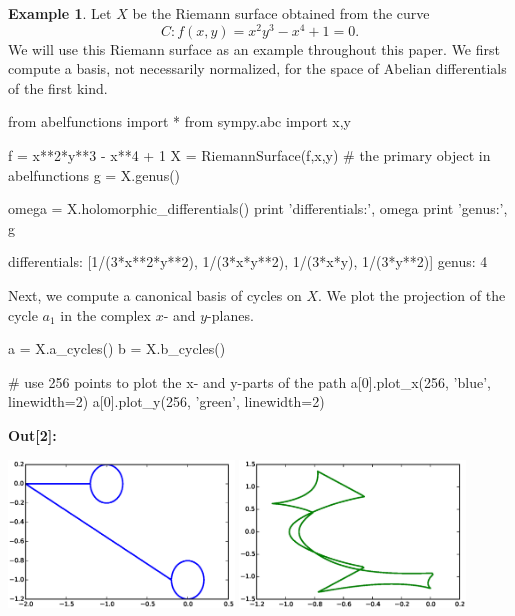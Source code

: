 \documentclass[12pt]{article}
\theoremstyle{definition}
\newtheorem{example}[theorem]{Example}
\begin{document}
\begin{example} \label{ex:riemannsurface} %
Let $X$ be the Riemann surface obtained from the curve
\begin{equation}
  C: f(x,y) = x^2y^3 - x^4 + 1 = 0.
\end{equation}
We will use this Riemann surface as an example throughout this paper. We
first compute a basis, not necessarily normalized, for the space of
Abelian differentials of the first kind.
\begin{ipythoninput}
from abelfunctions import *
from sympy.abc import x,y

f = x**2*y**3 - x**4 + 1
X = RiemannSurface(f,x,y)    # the primary object in abelfunctions
g = X.genus()

omega = X.holomorphic_differentials()
print 'differentials:', omega
print 'genus:', g
\end{ipythoninput}
\begin{ipythonoutput}
differentials: [1/(3*x**2*y**2), 1/(3*x*y**2), 1/(3*x*y), 1/(3*y**2)]
genus: 4
\end{ipythonoutput}
Next, we compute a canonical basis of cycles on $X$. We plot the
projection of the cycle $a_1$ in the complex $x$- and $y$-planes.
\begin{ipythoninput}
a = X.a_cycles()
b = X.b_cycles()

# use 256 points to plot the x- and y-parts of the path
a[0].plot_x(256, 'blue', linewidth=2)
a[0].plot_y(256, 'green', linewidth=2)
\end{ipythoninput}
\vspace{-12pt}
\begin{ipythonoutput}
\end{ipythonoutput}
\hspace{2pt} {\footnotesize\bf\ttfamily Out[2]:}

\includegraphics[width=0.45\textwidth]{a1x.eps}
\includegraphics[width=0.45\textwidth]{a1y.eps}


\end{example}
\end{document}
